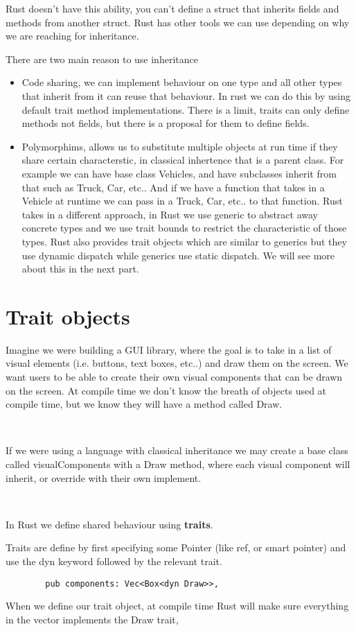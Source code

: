 Rust doesn't have this ability, you can't define a struct that inherits fields and methods from another struct. Rust has other tools we can use depending on why we are reaching for inheritance.

There are two main reason to use inheritance\begin{itemize}
    \item Code sharing, we can implement behaviour on one type and all other types that inherit from it can reuse that behaviour. In rust we can do this by using default trait method implementations. There is a limit, traits can only define methods not fields, but there is a proposal for them to define fields.
    \item Polymorphims, allows us to substitute multiple objects at run time if they share certain characterstic, in classical inhertence that is a parent class. For example we can have base class Vehicles, and have subclasses inherit from that such as Truck, Car, etc.. And if we have a function that takes in a Vehicle at runtime we can pass in a Truck, Car, etc.. to that function.
    Rust takes in a different approach, in Rust we use generic to abstract away concrete types and we use trait bounds to restrict the characteristic of those types. Rust also provides trait objects which are similar to generics but they use dynamic dispatch while generics use static dispatch. We will see more about this in the next part.
\end{itemize}


\section{Trait objects}
Imagine we were building a GUI library, where the goal is to take in a list of visual elements (i.e. buttons, text boxes, etc..) and draw them on the screen. We want users to be able to create their own visual components that can be drawn on the screen. At compile time we don't know the breath of objects used at compile time, but we know they will have a method called Draw.

\

If we were using a language with classical inheritance we may create a base class called visualComponents with a Draw method, where each visual component will inherit, or override with their own implement. 

\

In Rust we define shared behaviour using \textbf{traits}.

\begin{definition}
    Traits are define by first specifying some Pointer (like ref, or smart pointer) and use the dyn keyword followed by the relevant trait.
    
    \begin{lstlisting}
        pub components: Vec<Box<dyn Draw>>,
    \end{lstlisting}

When we define our trait object, at compile time Rust will make sure everything in the vector implements the Draw trait,
\end{definition}

